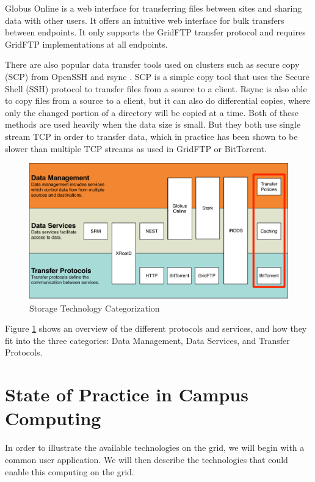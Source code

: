 Globus Online \cite{foster2011globus} is a web interface for transferring files between sites and sharing data with other users.  It offers an intuitive web interface for bulk transfers between endpoints.  It only supports the GridFTP \cite{allcock2005globus} transfer protocol and requires GridFTP implementations at all endpoints.

There are also popular data transfer tools used on clusters such as secure copy (SCP) from OpenSSH \cite{openssh} and rsync \cite{rsynce}.  SCP is a simple copy tool that uses the Secure Shell (SSH) protocol to transfer files from a source to a client.  Rsync is also able to copy files from a source to a client, but it can also do differential copies, where only the changed portion of a directory will be copied at a time.  Both of these methods are used heavily when the data size is small.  But they both use single stream TCP in order to transfer data, which in practice has been shown to be slower than multiple TCP streams as used in GridFTP \cite{allcock2005globus} or BitTorrent.



\begin{figure}[ht!]
	\centering
	\includegraphics[width=\textwidth]{images/BackgroundStorageDiagram2.pdf}
	\caption{Storage Technology Categorization}
	\label{fig:backgroundstorage}
\end{figure}

Figure \ref{fig:backgroundstorage} shows an overview of the different protocols and services, and how they fit into the three categories: Data Management, Data Services, and Transfer Protocols.

\section{State of Practice in Campus Computing}
\label{sec:currentapproach}
In order to illustrate the available technologies on the grid, we will begin with a common user application.  We will then describe the technologies that could enable this computing on the grid.

